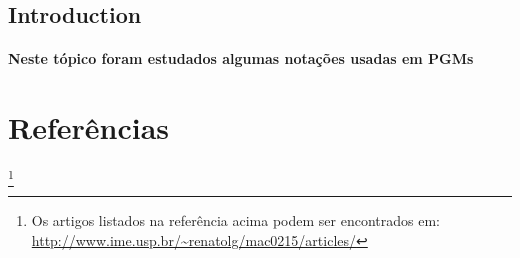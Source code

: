 \documentclass[a4paper,10pt]{article}
\newcommand\blfootnote[1]{%
  \begingroup
  \renewcommand\thefootnote{}\footnote{#1}%
  \addtocounter{footnote}{-1}%
  \endgroup
}
\theoremstyle{plain}
\begin{document}
\subsection{Introduction}

\paragraph{
  Neste tópico foram estudados algumas notações usadas em PGMs 
}

\section{Referências}

\blfootnote{Os artigos listados na referência acima podem ser encontrados em: 
  \url{http://www.ime.usp.br/~renatolg/mac0215/articles/}}

\printbibliography[title={Artigos},type=article]
\printbibliography[title={Websites},type=misc]
\end{document}
